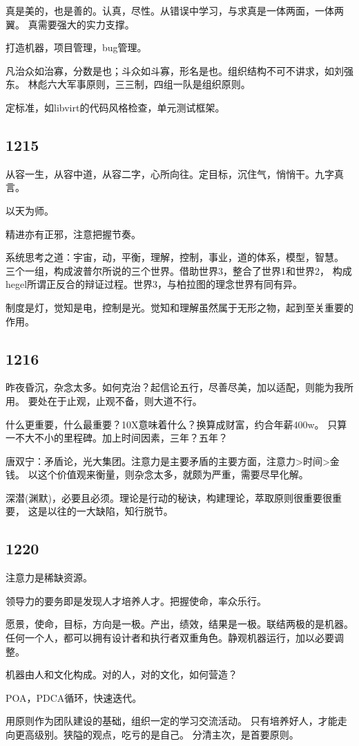 真是美的，也是善的。认真，尽性。从错误中学习，与求真是一体两面，一体两翼。
真需要强大的实力支撑。

打造机器，项目管理，bug管理。

凡治众如治寡，分数是也；斗众如斗寡，形名是也。组织结构不可不讲求，如刘强东。
林彪六大军事原则，三三制，四组一队是组织原则。

定标准，如libvirt的代码风格检查，单元测试框架。

\subsection{1215}

从容一生，从容中道，从容二字，心所向往。定目标，沉住气，悄悄干。九字真言。

以天为师。

精进亦有正邪，注意把握节奏。

系统思考之道：宇宙，动，平衡，理解，控制，事业，道的体系，模型，智慧。
三个一组，构成波普尔所说的三个世界。借助世界3，整合了世界1和世界2，
构成hegel所谓正反合的辩证过程。世界3，与柏拉图的理念世界有同有异。

制度是灯，觉知是电，控制是光。觉知和理解虽然属于无形之物，起到至关重要的作用。

\subsection{1216}

昨夜昏沉，杂念太多。如何克治？起信论五行，尽善尽美，加以适配，则能为我所用。
要处在于止观，止观不备，则大道不行。

什么更重要，什么最重要？10X意味着什么？换算成财富，约合年薪400w。
只算一不大不小的里程碑。加上时间因素，三年？五年？

唐双宁：矛盾论，光大集团。注意力是主要矛盾的主要方面，注意力>时间>金钱。
以这个价值观来衡量，则杂念太多，就颇为严重，需要尽早化解。

深潜(渊默)，必要且必须。理论是行动的秘诀，构建理论，萃取原则很重要很重要，
这是以往的一大缺陷，知行脱节。

\subsection{1220}

注意力是稀缺资源。

领导力的要务即是发现人才培养人才。把握使命，率众乐行。

愿景，使命，目标，方向是一极。产出，绩效，结果是一极。联结两极的是机器。
任何一个人，都可以拥有设计者和执行者双重角色。静观机器运行，加以必要调整。

机器由人和文化构成。对的人，对的文化，如何营造？

POA，PDCA循环，快速迭代。

用原则作为团队建设的基础，组织一定的学习交流活动。
只有培养好人，才能走向更高级别。狭隘的观点，吃亏的是自己。
分清主次，是首要原则。
